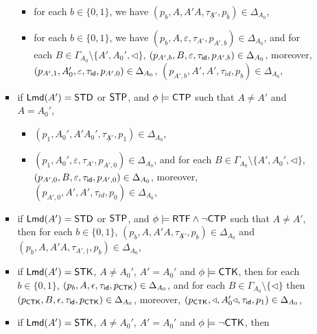 \begin{itemize}
\begin{itemize}
\begin{itemize}
                    \begin{itemize}
                        \item for each $b\in\{0,1\}$, we have $(p_b, A, A'A, \tau_{\not A'}, p_b) \in \Delta_{A_0}$, 
                        \item for each $b\in\{0,1\}$, we have $(p_b, A, \varepsilon, \tau_{A'}, p_{A',b}) \in \Delta_{A_0}$, and for each $B \in \Gamma_{A_0}\setminus\{A',A_0',\triangleleft\}$, $(p_{A',b}, B, \varepsilon, \tau_{\mathsf{id}}, p_{A',b}) \in \Delta_{A_0}$, moreover, $(p_{A',1},A_0',\varepsilon,\tau_{\mathsf{id}},p_{A',0})\in\Delta_{A_0}$, $(p_{A',b}, A', A', \tau_{id}, p_b)  \in \Delta_{A_0}$, 
                    \end{itemize}
                    \item if ${\sf Lmd}(A') = \mathsf{STD}$ or $\mathsf{STP}$, and $\phi\models {\sf CTP}$ such that $A\neq A'$ and $A = A_0'$,
                    \begin{itemize}
                        \item $(p_1, A_0', A'A_0', \tau_{\not A'}, p_1) \in \Delta_{A_0}$, 
                        \item $(p_1, A_0', \varepsilon, \tau_{A'}, p_{A',0}) \in \Delta_{A_0}$, and for each $B \in \Gamma_{A_0}\setminus\{A',A_0',\triangleleft\}$, $(p_{A',0}, B, \varepsilon, \tau_{\mathsf{id}}, p_{A',0}) \in \Delta_{A_0}$, moreover, $(p_{A',0}, A', A', \tau_{id}, p_0)  \in \Delta_{A_0}$, 
                    \end{itemize}
                    \item if ${\sf Lmd}(A') = \mathsf{STD}$ or $\mathsf{STP}$, and $\phi\models{\sf RTF}\wedge\neg{\sf CTP}$ such that $A\neq A'$,
                    then for each $b\in\{0,1\}$, $(p_b, A, A'A, \tau_{\not A'}, p_b) \in \Delta_{A_0}$ 
                    and $(p_b, A, A'A, \tau_{A', \dag}, p_b) \in \Delta_{A_0}$,
                    \item if ${\sf Lmd}(A') = \mathsf{STK}$, $A\neq A_0'$, $A' = A_0'$ and $\phi\models{\sf CTK}$, then
                    for each $b\in\{0,1\}$, $(p_b, A, \epsilon, \tau_{\mathsf{id}}, p_{{\sf CTK}})\in\Delta_{A_0}$, 
                    and for each $B\in\Gamma_{A_0}\setminus\{\triangleleft\}$ then $(p_{{\sf CTK}},B,\epsilon,\tau_{\mathsf{id}}, p_{{\sf CTK}})\in\Delta_{A_0}$, moreover, $(p_{{\sf CTK}},\triangleleft,A_0'\triangleleft,\tau_{\mathsf{id}},p_1)\in\Delta_{A_0}$,
                    \item if ${\sf Lmd}(A') = \mathsf{STK}$, $A\neq A_0'$, $A' = A_0'$ and $\phi\models\neg{\sf CTK}$, then

\end{itemize}
\end{itemize}
\end{itemize}
